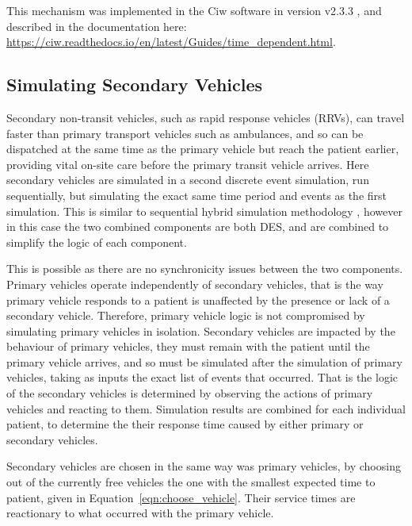 \documentclass[preprint,12pt]{elsarticle}
\begin{document}
This mechanism was implemented in the Ciw software in version v2.3.3 \cite{ciw233}, and described in the documentation here: \url{https://ciw.readthedocs.io/en/latest/Guides/time_dependent.html}.

\subsection{Simulating Secondary Vehicles}\label{sec:simulation_secondary}
Secondary non-transit vehicles, such as rapid response vehicles (RRVs), can
travel faster than primary transport vehicles such as ambulances, and so can be
dispatched at the same time as the primary vehicle but reach the patient
earlier, providing vital on-site care before the primary transit vehicle
arrives.
Here secondary vehicles are simulated in a second discrete event simulation, run
sequentially, but simulating the exact same time period and events as the first
simulation. This is similar to sequential hybrid simulation methodology
\cite{brailsfordetal19, morganetal17}, however in this case the two combined components are both DES, and are combined to simplify the logic of each component.

This is possible as there are no synchronicity issues between the two components.
Primary vehicles operate independently of secondary vehicles, that is the way
primary vehicle responds to a patient is unaffected by the presence or lack of a
secondary vehicle.
Therefore, primary vehicle logic is not compromised by simulating primary
vehicles in isolation.
Secondary vehicles are impacted by the behaviour of primary vehicles, they must
remain with the patient until the primary vehicle arrives, and so must be
simulated after the simulation of primary vehicles, taking as inputs the exact
list of events that occurred. That is the logic of the secondary vehicles is
determined by observing the actions of primary vehicles and reacting to them.
Simulation results are combined for each individual patient, to determine the their response time caused by either primary or secondary vehicles.

Secondary vehicles are chosen in the same way was primary vehicles, by choosing
out of the currently free vehicles the one with the smallest expected time to
patient, given in Equation~\ref{eqn:choose_vehicle}. Their service times are reactionary to what occurred with the primary vehicle.
\end{document}
